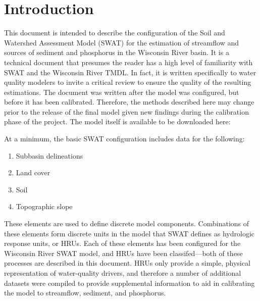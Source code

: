 \section{Introduction}
This document is intended to describe the configuration of the Soil and Watershed Assessment Model (SWAT) for the estimation of streamflow and sources of sediment and phosphorus in the Wisconsin River basin. It is a technical document that presumes the reader has a high level of familiarity with SWAT and the Wisconsin River TMDL. In fact, it is written specifically to water quality modelers to invite a critical review to ensure the quality of the resulting estimations. The document was written after the model was configured, but before it has been calibrated. Therefore, the methods described here may change prior to the release of the final model given new findings during the calibration phase of the project. The model itself is available to be downloaded here:

At a minimum, the basic SWAT configuration includes data for the following:

\begin{enumerate}
	\item Subbasin delineations
	\item Land cover
	\item Soil
	\item Topographic slope
\end{enumerate}

These elements are used to define discrete model components. Combinations of these elements form discrete units in the model that SWAT defines as hydrologic response units, or HRUs. Each of these elements has been configured for the Wisconsin River SWAT model, and HRUs have been classifed---both of these processes are described in this document. HRUs only provide a simple, physical representation of water-quality drivers, and therefore a number of additional datasets were compiled to provide supplemental information to aid in calibrating the model to streamflow, sediment, and phosphorus.

